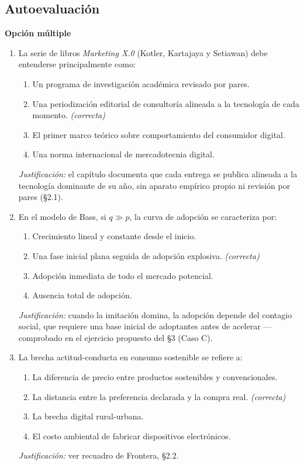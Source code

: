 \subsection*{Autoevaluación}

\textbf{Opción múltiple}

\begin{enumerate}
  \item La serie de libros \textit{Marketing X.0} (Kotler, Kartajaya y
  Setiawan) debe entenderse principalmente como:
  \begin{enumerate}
    \item[a)] Un programa de investigación académica revisado por pares.
    \item[b)] Una periodización editorial de consultoría alineada a la tecnología de cada momento. \textit{(correcta)}
    \item[c)] El primer marco teórico sobre comportamiento del consumidor digital.
    \item[d)] Una norma internacional de mercadotecnia digital.
  \end{enumerate}
  \textit{Justificación:} el capítulo documenta que cada entrega se publica
  alineada a la tecnología dominante de su año, sin aparato empírico propio
  ni revisión por pares (\S 2.1).

  \item En el modelo de Bass, si $q \gg p$, la curva de adopción se
  caracteriza por:
  \begin{enumerate}
    \item[a)] Crecimiento lineal y constante desde el inicio.
    \item[b)] Una fase inicial plana seguida de adopción explosiva. \textit{(correcta)}
    \item[c)] Adopción inmediata de todo el mercado potencial.
    \item[d)] Ausencia total de adopción.
  \end{enumerate}
  \textit{Justificación:} cuando la imitación domina, la adopción depende del
  contagio social, que requiere una base inicial de adoptantes antes de
  acelerar — comprobado en el ejercicio propuesto del \S 3 (Caso C).

  \item La brecha actitud-conducta en consumo sostenible se refiere a:
  \begin{enumerate}
    \item[a)] La diferencia de precio entre productos sostenibles y convencionales.
    \item[b)] La distancia entre la preferencia declarada y la compra real. \textit{(correcta)}
    \item[c)] La brecha digital rural-urbana.
    \item[d)] El costo ambiental de fabricar dispositivos electrónicos.
  \end{enumerate}
  \textit{Justificación:} ver recuadro de Frontera, \S 2.2.
\end{enumerate}

